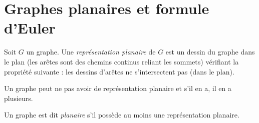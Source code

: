 
\chapter{Graphes planaires et formule d'Euler}


\begin{definition}
Soit $G$ un graphe. Une \emph{représentation planaire} de $G$ est un dessin du graphe dans le plan (les arêtes sont des chemins continus reliant les sommets) vérifiant la propriété suivante : les dessins d'arêtes ne s'intersectent pas (dans le plan).

Un graphe peut ne pas avoir de représentation planaire et s'il en a, il en a plusieurs.


Un graphe est dit \emph{planaire} s'il possède au moins une représentation planaire.
\end{definition}



